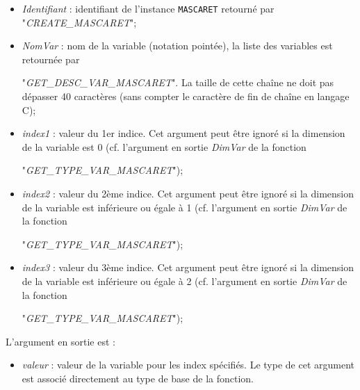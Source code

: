 \documentclass[a4paper,11pt]{article}
\begin{document}
 \begin{itemize}
 
    \item \textit{Identifiant} : identifiant de l'instance \texttt{MASCARET} retourn\'e par "\textit{CREATE\_MASCARET}";
    \vspace{0.5cm}
    \item \textit{NomVar} : nom de la variable (notation point\'ee), la liste des variables est retourn\'ee par
    
     "\textit{GET\_DESC\_VAR\_MASCARET}". La taille de cette cha\^ine ne doit pas d\'epasser 40 caract\`eres (sans compter le caract\`ere de fin de cha\^ine en langage C);
    \vspace{0.5cm}
    \item \textit{index1} : valeur du 1er indice. Cet argument peut \^etre ignor\'e si la dimension de la variable est 0 (cf. l'argument en sortie \textit{DimVar} de la fonction
    
     "\textit{GET\_TYPE\_VAR\_MASCARET}");
    \vspace{0.5cm}
    \item \textit{index2} : valeur du 2\`eme indice. Cet argument peut \^etre ignor\'e si la dimension de la variable est inf\'erieure ou \'egale \`a 1 (cf. l'argument en sortie \textit{DimVar} de la fonction
    
     "\textit{GET\_TYPE\_VAR\_MASCARET}");
     \vspace{0.5cm}
    \item \textit{index3} : valeur du 3\`eme indice. Cet argument peut \^etre ignor\'e si la dimension de la variable est inf\'erieure ou \'egale \`a 2 (cf. l'argument en sortie \textit{DimVar} de la fonction
    
     "\textit{GET\_TYPE\_VAR\_MASCARET}");

 \end{itemize}

\vspace{0.5cm}

 L'argument en sortie est :
 
 \vspace{0.5cm}
 
 \begin{itemize}
 
    \item \textit{valeur} : valeur de la variable pour les index sp\'ecifi\'es. Le type de cet argument est associ\'e directement au type de base de la fonction.
     
 \end{itemize}
\end{document}
